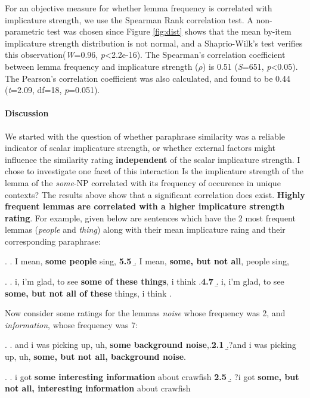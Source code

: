 \documentclass[10pt, biblatex, linguex]{report}
\begin{document}
For an objective measure for whether lemma frequency is correlated with implicature
strength, we use the Spearman Rank correlation test. A non-parametric test was
chosen since Figure \ref{fig:dist} shows that the mean by-item implicature strength
distribution is not normal, and a Shaprio-Wilk's test \citep{shapiro_analysis_1965}
verifies this observation(\textit{W}=0.96, \textit{p}<2.2e-16). The Spearman's
correlation coefficient between lemma frequency and implicature strength ($\rho$)
is 0.51 (\textit{S}=651, \textit{p}<0.05). The Pearson's correlation coefficient
was  also calculated, and found to be 0.44 (\textit{t}=2.09, df=18,
\textit{p}=0.051).

\paragraph{Discussion} We started with the question of whether paraphrase
similarity was a reliable indicator of scalar implicature strength, or whether
external factors might influence the similarity rating \textbf{independent} of the
scalar implicature strength. I chose to investigate one facet of this
interaction \dash Is the implicature strength of the lemma of the
\textit{some}-NP correlated with its frequency of occurence in unique contexts?
The results above show that a significant correlation does exist.
\textbf{Highly frequent lemmas are correlated with a higher implicature strength
rating}. For example, given below are sentences which have the 2 most frequent
lemmas (\textit{people} and \textit{thing}) along with their mean implicature
raing and their corresponding paraphrase:

\ex. \a. I mean, \textbf{some people} sing, \hfill \textbf{5.5}
     \b. I mean, \textbf{some, but not all}, people sing,

\ex. \a. i, i'm glad, to see \textbf{some of these things}, i think .\hfill \textbf{4.7}
     \b. i, i'm glad, to see\textbf{ some, but not all of these} things, i think .

Now consider some ratings for the lemmas \textit{noise} whose frequency was 2,
and \textit{information}, whose frequency was 7:

\ex. \a. and i was picking up, uh, \textbf{some background noise},.\hfill \textbf{2.1}
     \b.?and i was picking up, uh, \textbf{some, but not all, background noise}.\label{ex:unacc-a}

\ex. \a. i got \textbf{some interesting information} about crawfish \hfill \textbf{2.5}
     \b. ?i got \textbf{some, but not all, interesting information} about crawfish\label{ex:unacc-b}
\end{document}

